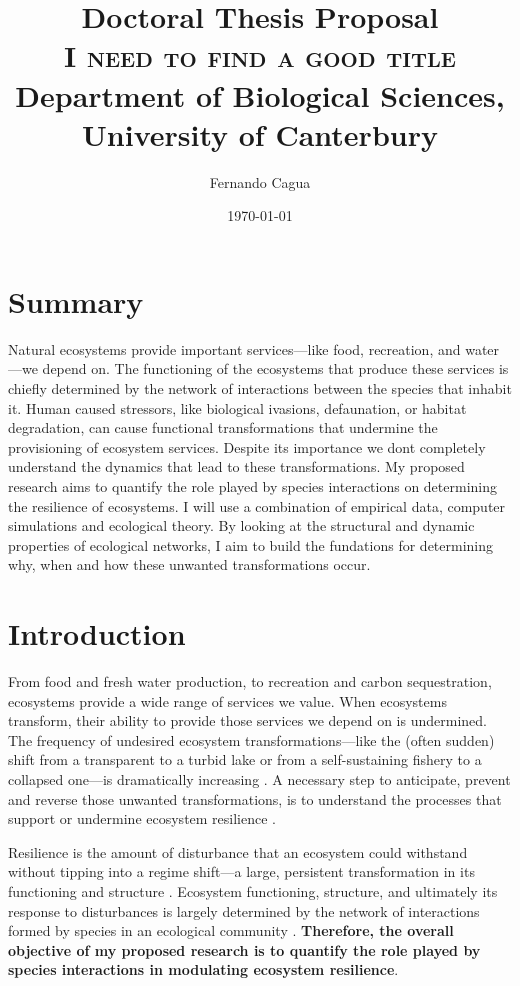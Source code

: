 \documentclass[a4paper]{report}
\title{
	{\large Doctoral Thesis Proposal} \\
	{\Huge \textsc{I need to find a good title}} \\
	{\large Department of Biological Sciences, University of Canterbury}
}
\author{
  {\Large Fernando Cagua} \\
}
\date{\normalsize \today}
\begin{document}
\maketitle

\chapter*{Summary}

Natural ecosystems provide important services---like food, recreation, and water---we depend on. 
The functioning of the ecosystems that produce these services is chiefly determined by the network of interactions between the species that inhabit it. 
Human caused stressors, like biological ivasions, defaunation, or habitat degradation, can cause functional transformations that undermine the provisioning of ecosystem services. 
Despite its importance we dont completely understand the dynamics that lead to these transformations.
My proposed research aims to quantify the role played by species interactions on determining the resilience of ecosystems.
I will use a combination of empirical data, computer simulations and ecological theory. 
By looking at the structural and dynamic properties of ecological networks, I aim to build the fundations for determining why, when and how these unwanted transformations occur. 

\chapter*{Introduction}

From food and fresh water production, to recreation and carbon sequestration, ecosystems provide a wide range of services we value. When ecosystems transform, their ability to provide those services we depend on is undermined. 
The frequency of undesired ecosystem transformations---like the (often sudden) shift from a transparent to a turbid lake or from a self-sustaining fishery to a collapsed one---is dramatically increasing \citep{Scheffer2001a}. 
A necessary step to anticipate, prevent and reverse those unwanted transformations, is to understand the processes that support or undermine ecosystem resilience \citep{Hughes2005, Tylianakis2008}. 
 
Resilience is the amount of disturbance that an ecosystem could withstand without tipping into a regime shift---a large, persistent transformation in its functioning and structure \citep{Holling1973, Gunderson2000}. 
Ecosystem functioning, structure, and ultimately its response to disturbances is largely determined by the network of interactions formed by species in an ecological community \citep{Bascompte2006, Dobson2006, Tylianakis2008, Reiss2009}. 
\textbf{Therefore, the overall objective of my proposed research is to quantify the role played by species interactions in modulating ecosystem resilience}.  
\end{document}
